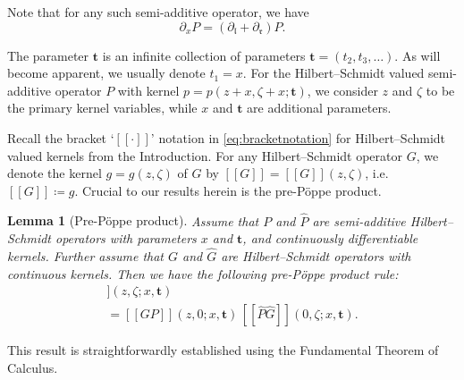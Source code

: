 \documentclass[5p,twocolumn]{elsarticle}
\newcommand*{\pa}{{\partial}}
\newcommand*{\lb}{[\![}
\newcommand*{\rb}{]\!]}
\newcommand*{\tbf}{\boldsymbol{t}}
\newcommand*{\el}{\mathfrak l}
\newcommand*{\rl}{\mathfrak r}
\newtheorem{lemma}[theorem]{Lemma}
\begin{document}
%
Note that for any such semi-additive operator, we have
\begin{equation*}
  \pa_xP=(\pa_\el+\pa_{\rl})P.  
\end{equation*}
%
\begin{remark}
  The parameter $\tbf$ is an infinite collection of parameters $\tbf=(t_2,t_3,\ldots)$.
  As will become apparent, we usually denote $t_1=x$.
  For the Hilbert--Schmidt valued semi-additive operator $P$ with kernel $p=p(z+x,\zeta+x;\tbf)$,
  we consider $z$ and $\zeta$ to be the primary kernel variables, while $x$ and $\tbf$ are additional parameters.
\end{remark}
%
Recall the bracket `$\lb\cdot\rb$' notation in \eqref{eq:bracketnotation} for Hilbert--Schmidt valued kernels from the Introduction.
For any Hilbert--Schmidt operator $G$, we denote the kernel $g=g(z,\zeta)$ of $G$ by $\lb G\rb=\lb G\rb(z,\zeta)$, i.e.\/ $\lb G\rb\coloneqq g$.
Crucial to our results herein is the pre-P\"oppe product. 
%
\begin{lemma}[Pre-P\"oppe product]\label{lemma:Poppeprodsemiadd}
  Assume that $P$ and $\hat P$ are semi-additive Hilbert--Schmidt operators with parameters $x$ and $\tbf$, and continuously differentiable kernels.
  Further assume that $G$ and $\hat G$ are Hilbert--Schmidt operators with continuous kernels. Then we have the following pre-P\"oppe product rule:
  \begin{multline*}
    \lb G(P_{0,1}\hat P\!+\!P\hat{P}_{1,0})\hat{G}\rb(z,\zeta;x,\tbf)\\=\lb GP\rb(z,0;x,\tbf)\,\lb\hat{P}\hat{G}\rb(0,\zeta;x,\tbf).
  \end{multline*}
\end{lemma}
%
This result is straightforwardly established using the Fundamental Theorem of Calculus.
\end{document}
